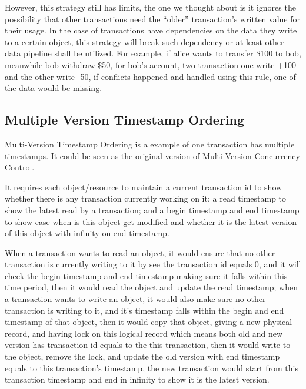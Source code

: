 However, this strategy still has limits, the one we thought about is it ignores the possibility that other transactions need the ``older'' transaction's written value for their usage. In the case of transactions have dependencies on the data they write to a certain object, this strategy will break such dependency or at least other data pipeline shall be utilized. For example, if alice wants to transfer \$100 to bob, meanwhile bob withdraw \$50, for bob's account, two transaction one write +100 and the other write -50, if conflicts happened and handled using this rule, one of the data would be missing.

\subsection{Multiple Version Timestamp Ordering}

Multi-Version Timestamp Ordering is a example of one transaction has multiple timestamps\cite{reed1978naming}. It could be seen as the original version of Multi-Version Concurrency Control.

It requires each object/resource to maintain a current transaction id to show whether there is any transaction currently working on it; a read timestamp to show the latest read by a transaction; and a begin timestamp and end timestamp to show case when is this object get modified and whether it is the latest version of this object with infinity on end timestamp.

When a transaction wants to read an object, it would ensure that no other transaction is currently writing to it by see the transaction id equals 0, and it will check the begin timestamp and end timestamp making sure it falls within this time period, then it would read the object and update the read timestamp; when a transaction wants to write an object, it would also make sure no other transaction is writing to it, and it's timestamp falls within the begin and end timestamp of that object, then it would copy that object, giving a new physical record, and having lock on this logical record which means both old and new version has transaction id equals to the this transaction, then it would write to the object, remove the lock, and update the old version with end timestamp equals to this transaction's timestamp, the new transaction would start from this transaction timestamp and end in infinity to show it is the latest version. 

